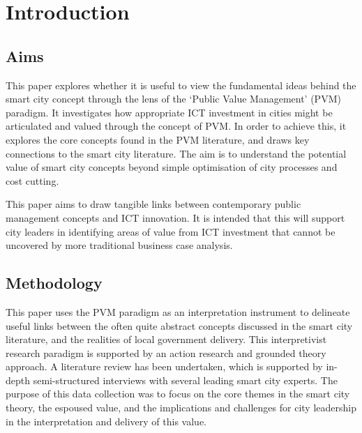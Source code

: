 \documentclass[conference]{IEEEtran}
\begin{document}
%


\section{Introduction}

\subsection{Aims}
This paper explores whether it is useful to view the fundamental ideas
behind the smart city concept through the lens of the `Public Value
Management' (PVM) paradigm. It investigates how appropriate ICT
investment in cities might be articulated and valued through the
concept of PVM. In order to achieve this, it explores the core
concepts found in the PVM literature, and draws key connections to the
smart city literature. The aim is to understand the potential value of
smart city concepts beyond simple optimisation of city processes and
cost cutting.

This paper aims to draw tangible links between contemporary public
management concepts and ICT innovation. It is intended that this will
support city leaders in identifying areas of value from ICT investment
that cannot be uncovered by more traditional business case analysis.

\subsection{Methodology}
This paper uses the PVM paradigm as an interpretation instrument to
delineate useful links between the often quite abstract concepts
discussed in the smart city literature, and the realities of local
government delivery. This interpretivist research paradigm is
supported by an action research and grounded theory approach. A
literature review has been undertaken, which is supported by in-depth
semi-structured interviews with several leading smart city
experts. The purpose of this data collection was to focus on the core
themes in the smart city theory, the espoused value, and the
implications and challenges for city leadership in the interpretation
and delivery of this value.
\end{document}
